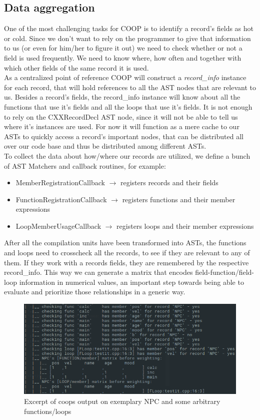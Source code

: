 \subsection{Data aggregation}\label{data_aggregation}
One of the most challenging tasks for COOP is to identify a record's fields as hot or cold. Since we don't want to rely on the programmer to give that information to us (or even for him/her to figure it out) we need to check whether or not a field is used frequently. We need to know where, how often and together with which other fields of the same record it is used.\\
As a centralized point of reference COOP will construct a \textit{record\_info} instance for each record, that will hold references to all the AST nodes that are relevant to us. Besides a record's fields, the record\_info instance will know about all the functions that use it's fields and all the loops that use it's fields. It is not enough to rely on the CXXRecordDecl AST node, since it will not be able to tell us where it's instances are used. For now it will function as a mere cache to our ASTs to quickly access a record's important nodes, that can be distributed all over our code base and thus be distributed among different ASTs.\\
To collect the data about how/where our records are utilized, we define a bunch of AST Matchers and callback routines, for example:
\begin{itemize}
	\item MemberRegistrationCallback $\rightarrow$ registers records and their fields
	\item FunctionRegistrationCallback $\rightarrow$ registers functions and their member expressions
	\item LoopMemberUsageCallback $\rightarrow$ registers loops and their member expressions
\end{itemize}
After all the compilation units have been transformed into ASTs, the functions and loops need to crosscheck all the records, to see if they are relevant to any of them. If they work with a records fields, they are remembered by the respective record\_info. This way we can generate a matrix that encodes field-function/field-loop information in numerical values, an important step towards being able to evaluate and prioritize those relationships in a generic way.
\begin{figure}[!htbp]
	\centering
	\includegraphics[width=.7\linewidth, height=0.3\linewidth]{PICs/npc_crosscheck_matrix}
	\caption{Excerpt of coops output on exemplary NPC and some arbitrary functions/loops}\label{npc_crosscheck_matrix}
\end{figure}
